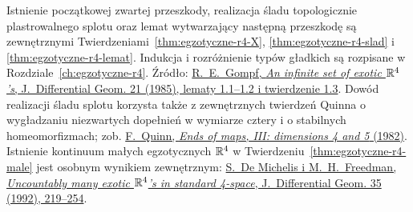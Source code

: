 \begin{description}[leftmargin=2.9cm,style=nextline]
\item[Egzotyczne struktury gładkie na $\R^4$.]
  Istnienie początkowej zwartej przeszkody, realizacja
  śladu topologicznie plastrowalnego splotu oraz
  lemat wytwarzający następną przeszkodę są zewnętrznymi
  Twierdzeniami~\ref{thm:egzotyczne-r4-X},
  \ref{thm:egzotyczne-r4-slad} i
  \ref{thm:egzotyczne-r4-lemat}. Indukcja i rozróżnienie
  typów gładkich są rozpisane w
  Rozdziale~\ref{ch:egzotyczne-r4}.
  Źródło:
  \href{https://doi.org/10.4310/jdg/1214439566}
  {R.~E.~Gompf, \emph{An infinite set of exotic
  $\R^4$'s}, J.~Differential Geom. 21 (1985),
  lematy 1.1--1.2 i twierdzenie 1.3}.
  Dowód realizacji śladu splotu korzysta także z
  zewnętrznych twierdzeń Quinna o wygładzaniu
  niezwartych dopełnień w wymiarze cztery i o stabilnych
  homeomorfizmach; zob.
  \href{https://www.maths.gla.ac.uk/~mpowell/1982_Ends%20of%20maps%20III.pdf}
  {F.\ Quinn, \emph{Ends of maps, III: dimensions 4 and 5}
  (1982)}.
  Istnienie kontinuum małych egzotycznych $\R^4$
  w Twierdzeniu~\ref{thm:egzotyczne-r4-male}
  jest osobnym wynikiem zewnętrznym:
  \href{https://doi.org/10.4310/jdg/1214447810}
  {S.~De Michelis i M.~H.~Freedman,
  \emph{Uncountably many exotic $\R^4$'s in
  standard 4-space}, J.~Differential Geom. 35
  (1992), 219--254}.
\end{description}
